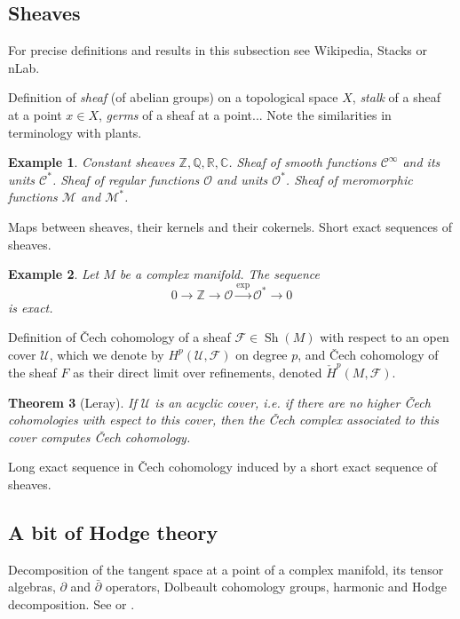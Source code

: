 \documentclass[12pt]{article}
\theoremstyle{darkgreentheorem}
\newtheorem{thm}{Theorem}
\theoremstyle{darkbluedefinition}
\theoremstyle{darkredexample}
\newtheorem{exa}[thm]{Example}
\theoremstyle{remark}
\newcommand{\Z}{\mathbb{Z}}
\newcommand{\Q}{\mathbb{Q}}
\newcommand{\R}{\mathbb{R}}
\newcommand{\1}{\mathbbm{1}}
\newcommand{\C}{\mathbb{C}}
\newcommand{\calC}{\mathcal{C}}
\newcommand{\F}{\mathcal{F}}
\newcommand{\M}{\mathcal{M}}
\renewcommand{\O}{\mathcal{O}}
\newcommand{\U}{\mathcal{U}}
\DeclareMathOperator{\Sh}{Sh}
\begin{document}
\subsection{Sheaves}

For precise definitions and results in this subsection see Wikipedia, Stacks or nLab.

Definition of \textit{sheaf} (of abelian groups) on a topological space $X$, \textit{stalk} of a sheaf at a point $x\in X$, \textit{germs} of a sheaf at a point... Note the similarities in terminology with plants.

\begin{exa}
    Constant sheaves $\Z,\Q,\R,\C$.
    Sheaf of smooth functions $\calC^{\infty}$ and its units $\calC^{*}$.
    Sheaf of regular functions $\O$ and units $\O^{*}$.
    Sheaf of meromorphic functions $\M$ and $\M^{*}$.
\end{exa}

Maps between sheaves, their kernels and their cokernels.
Short exact sequences of sheaves.

\begin{exa}
    Let $M$ be a complex manifold.
    The sequence
    \[ 0\to \Z\to \O\xrightarrow{\exp} \O^{*}\to 0 \]
    is exact.
\end{exa}

Definition of \v{C}ech cohomology of a sheaf $\F\in \Sh(M)$ with respect to an open cover $\U$, which we denote by $H^{p}(\U,\F)$ on degree $p$, and \v{C}ech cohomology of the sheaf $F$ as their direct limit over refinements, denoted $\check{H}^{p}(M,\F)$.

\begin{thm}[Leray]
    If $\U$ is an acyclic cover, i.e. if there are no higher \v{C}ech cohomologies with espect to this cover, then the \v{C}ech complex associated to this cover computes \v{C}ech cohomology.
\end{thm}

Long exact sequence in \v{C}ech cohomology induced by a short exact sequence of sheaves.

\subsection{A bit of Hodge theory}

Decomposition of the tangent space at a point of a complex manifold, its tensor algebras, $\partial $ and $\bar{\partial }$ operators, Dolbeault cohomology groups, harmonic and Hodge decomposition.
See \cite{gh78} or \cite{voi07}.
\end{document}
